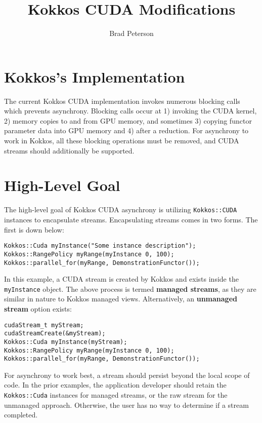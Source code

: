 \documentclass[]{article}
\title{Kokkos CUDA Modifications}
\author{Brad Peterson}
\date{}
\begin{document}
\maketitle
\section{Kokkos's Implementation}

The current Kokkos CUDA implementation  invokes numerous blocking calls which prevents asynchrony.  Blocking calls occur at 1) invoking the CUDA kernel, 2) memory copies to and from GPU memory, and sometimes 3) copying functor parameter data into GPU memory and 4) after a reduction.  For asynchrony to work in Kokkos, all these blocking operations must be removed, and CUDA streams should additionally be supported.

\section{High-Level Goal}

The high-level goal of Kokkos CUDA asynchrony is utilizing \texttt{Kokkos::CUDA} instances to encapsulate streams.  Encapsulating streams comes in two forms.  The first is down below:

\begin{lstlisting}
Kokkos::Cuda myInstance("Some instance description");
Kokkos::RangePolicy myRange(myInstance 0, 100);
Kokkos::parallel_for(myRange, DemonstrationFunctor());
\end{lstlisting}    

In this example, a CUDA stream is created by Kokkos and exists inside the \texttt{myInstance} object.  The above process is termed \textbf{managed streams}, as they are similar in nature to Kokkos managed views.  Alternatively, an \textbf{unmanaged stream} option exists:

\begin{lstlisting}
cudaStream_t myStream;
cudaStreamCreate(&myStream);
Kokkos::Cuda myInstance(myStream);
Kokkos::RangePolicy myRange(myInstance 0, 100);
Kokkos::parallel_for(myRange, DemonstrationFunctor());
\end{lstlisting}    

For asynchrony to work best, a stream should persist beyond the local scope of code.   In the prior examples, the application developer should retain the \texttt{Kokkos::Cuda} instances for managed streams, or the raw stream for the unmanaged approach.  Otherwise, the user has no way to determine if a stream completed.
\end{document}
